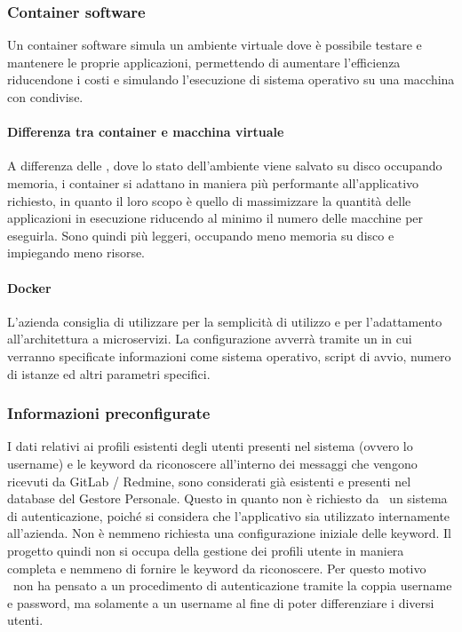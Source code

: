 	\subsubsection{Container software}
	
	Un container software simula un ambiente virtuale dove è possibile testare e mantenere le proprie applicazioni, permettendo di aumentare l'efficienza riducendone i costi e simulando l'esecuzione di sistema operativo su una macchina con  condivise.
		
		\paragraph{Differenza tra container e macchina virtuale}
		A differenza delle , dove lo stato dell'ambiente viene salvato su disco occupando memoria, i container si adattano in maniera più performante all'applicativo richiesto, in quanto il loro scopo è quello di massimizzare la quantità delle applicazioni in esecuzione riducendo al minimo il numero delle macchine per eseguirla.
		Sono quindi più leggeri, occupando meno memoria su disco e impiegando meno risorse.
		
		\paragraph{Docker}
		L'azienda consiglia di utilizzare  per la semplicità di utilizzo e per l'adattamento all'architettura a microservizi.
		La configurazione avverrà tramite un  in cui verranno specificate informazioni come sistema operativo, script di avvio, numero di istanze ed altri parametri specifici.

	\subsubsection{Informazioni preconfigurate}
	I dati relativi ai profili esistenti degli utenti presenti nel sistema (ovvero lo username) e le keyword da riconoscere all'interno dei messaggi che vengono ricevuti da GitLab / Redmine, sono considerati già esistenti e presenti nel database del Gestore Personale.
	Questo in quanto non è richiesto da \II\ un sistema di autenticazione, poiché si considera che l'applicativo sia utilizzato internamente all'azienda.
	Non è nemmeno richiesta una configurazione iniziale delle keyword.
	Il progetto quindi non si occupa della gestione dei profili utente in maniera completa e nemmeno di fornire le keyword da riconoscere.
	Per questo motivo \gruppo\ non ha pensato a un procedimento di autenticazione tramite la coppia username e password, ma solamente a un username al fine di poter differenziare i diversi utenti.